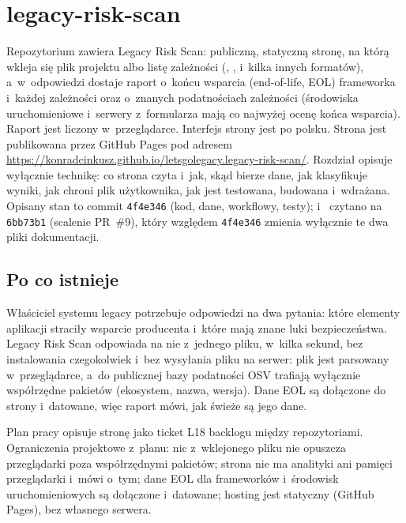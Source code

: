 \section{legacy-risk-scan}\label{sec:risk-scan}

Repozytorium  zawiera Legacy Risk Scan: publiczną,
statyczną stronę, na którą wkleja się plik projektu albo listę zależności (,
,  i~kilka innych formatów), a~w~odpowiedzi
dostaje raport o~końcu wsparcia (end-of-life, EOL) frameworka i~każdej zależności oraz
o~znanych podatnościach zależności (środowiska uruchomieniowe i~serwery z~formularza mają
co najwyżej ocenę końca wsparcia). Raport jest liczony w~przeglądarce. Interfejs strony jest po polsku. Strona
jest publikowana przez GitHub Pages pod adresem
\url{https://konradcinkusz.github.io/letsgolegacy.legacy-risk-scan/}. Rozdział opisuje
wyłącznie technikę: co strona czyta i~jak, skąd bierze dane, jak klasyfikuje wyniki, jak
chroni plik użytkownika, jak jest testowana, budowana i~wdrażana. Opisany stan to commit
\texttt{4f4e346} (kod, dane, workflowy, testy);  i~
czytano na \texttt{6bb73b1} (scalenie PR~\#9), który względem \texttt{4f4e346} zmienia
wyłącznie te dwa pliki dokumentacji.


\subsection{Po co istnieje}\label{sec:risk-scan-cel}

Właściciel systemu legacy potrzebuje odpowiedzi na dwa pytania: które elementy aplikacji
straciły wsparcie producenta i~które mają znane luki bezpieczeństwa. Legacy Risk Scan
odpowiada na nie z~jednego pliku, w~kilka sekund, bez instalowania czegokolwiek i~bez
wysyłania pliku na serwer: plik jest parsowany w~przeglądarce, a~do publicznej bazy
podatności OSV trafiają wyłącznie współrzędne pakietów (ekosystem, nazwa, wersja). Dane EOL
są dołączone do strony i~datowane, więc raport mówi, jak świeże są jego dane.

Plan pracy opisuje stronę jako ticket L18 backlogu między repozytoriami. Ograniczenia
projektowe z~planu: nic z~wklejonego pliku nie opuszcza przeglądarki poza współrzędnymi
pakietów; strona nie ma analityki ani pamięci przeglądarki i~mówi o~tym; dane EOL dla
frameworków i~środowisk uruchomieniowych są dołączone i~datowane; hosting jest statyczny
(GitHub Pages), bez własnego serwera.

